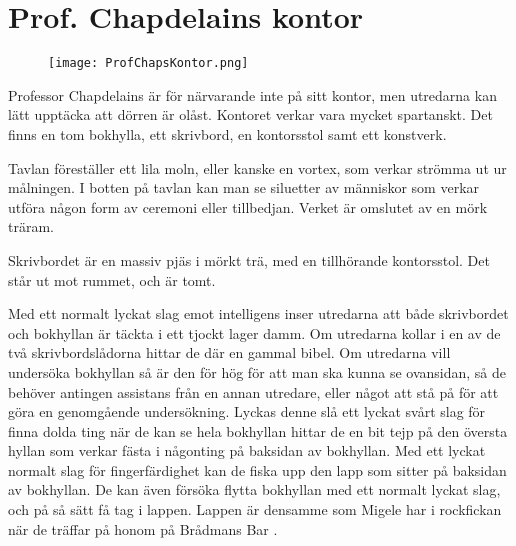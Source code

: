 \section{Prof. Chapdelains kontor}
\label{loc:ChapdelainsKontor}
%
\begin{figure}[h]
\texttt{[image: ProfChapsKontor.png]}
\centering
\end{figure}
%
Professor Chapdelains är för närvarande inte på sitt kontor, men utredarna kan lätt upptäcka att dörren är olåst. Kontoret verkar vara mycket spartanskt. Det finns en tom bokhylla, ett skrivbord, en kontorsstol samt ett konstverk.

\begin{displayquote}
	Tavlan föreställer ett lila moln, eller kanske en vortex, som verkar strömma ut ur målningen. I botten på tavlan kan man se siluetter av människor som verkar utföra någon form av ceremoni eller tillbedjan. Verket är omslutet av en mörk träram.
\end{displayquote}

\begin{displayquote}
	Skrivbordet är en massiv pjäs i mörkt trä, med en tillhörande kontorsstol. Det står ut mot rummet, och är tomt.
\end{displayquote}
%
Med ett normalt lyckat slag emot intelligens inser utredarna att både skrivbordet och bokhyllan är täckta i ett tjockt lager damm. Om utredarna kollar i en av de två skrivbordslådorna hittar de där en gammal bibel. Om utredarna vill undersöka bokhyllan så är den för hög för att man ska kunna se ovansidan, så de behöver antingen assistans från en annan utredare, eller något att stå på för att göra en genomgående undersökning. Lyckas denne slå ett lyckat svårt slag för finna dolda ting när de kan se hela bokhyllan hittar de en bit tejp på den översta hyllan som verkar fästa i någonting på baksidan av bokhyllan. Med ett lyckat normalt slag för fingerfärdighet kan de fiska upp den lapp som sitter på baksidan av bokhyllan. De kan även försöka flytta bokhyllan med ett normalt lyckat slag, och på så sätt få tag i lappen. Lappen är densamme som Migele har i rockfickan när de träffar på honom på Brådmans Bar \sectiondescribe{\ref{loc:BradmansBar}}.
